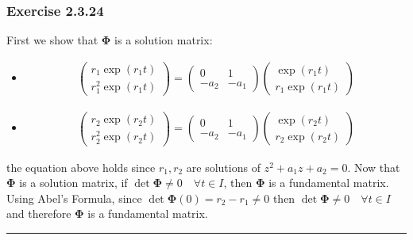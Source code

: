 \documentclass[12pt, letterpaper]{scrartcl}
\begin{document}
\subsubsection*{Exercise 2.3.24}
First we show that $\bm\Phi$ is a solution matrix:
\begin{itemize}
    \item
    \begin{align*}
        \left( \begin{array}{c} r_1\exp(r_1t) \\ r_1^2\exp(r_1t)  \end{array}\right)=
        \left( \begin{array}{cc} 0 & 1 \\ -a_2 & -a_1 \end{array}\right)
        \left( \begin{array}{c} \exp(r_1t)  \\ r_1\exp(r_1t)   \end{array}\right)
    \end{align*}
    \item 
    \begin{align*}
        \left( \begin{array}{c} r_2\exp(r_2t) \\ r_2^2\exp(r_2t)  \end{array}\right)=
        \left( \begin{array}{cc} 0 & 1 \\ -a_2 & -a_1 \end{array}\right)
        \left( \begin{array}{c} \exp(r_2t)  \\ r_2\exp(r_2t)   \end{array}\right)
    \end{align*}
\end{itemize}
the equation above holds since $r_1, r_2$ are solutions of $z^2+a_1z+a_2=0$.
Now that $\bm\Phi$ is a solution matrix, if $\det\bm\Phi\neq0\quad\forall t\in I$, then $\bm\Phi$ is a fundamental matrix.\\
Using Abel's Formula, since $\det\bm\Phi(0)=r_2-r_1\neq 0$ then $\det\bm\Phi\neq0\quad\forall t\in I$ and therefore $\bm\Phi$ is a fundamental matrix.
\vskip1mm\hrule
\end{document}
